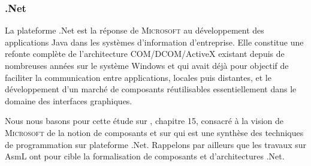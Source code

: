 \subsubsection{\textsf{.Net}}
\label{sec:.net}
La plateforme \textsf{.Net} est la r\'eponse de \textsc{Microsoft} au
d\'eveloppement des applications Java dans les syst\`emes
d'information d'entreprise. Elle constitue une refonte compl\`ete de
l'architecture \textsf{COM/DCOM/ActiveX}  existant depuis de nombreuses
ann\'ees sur le syst\`eme Windows et qui avait d\'ej\`a pour
objectif de faciliter la communication entre applications, locales
puis distantes, et le d\'eveloppement d'un march\'e de composants
r\'eutilisables essentiellement dans le domaine des interfaces
graphiques.

Nous nous basons pour cette \'etude sur \cite{szyperski}, chapitre
15, consacr\'e \`a la vision de \textsc{Microsoft} de la notion de
composants et sur \cite{lantin-dotnet} qui est une synth\`ese des
techniques de programmation sur plateforme  \textsf{.Net}. Rappelons
par ailleurs que les travaux sur
\textsf{AsmL}\cite{gurevich-asml-semantic,barnett-asm-components}  ont
pour cible la formalisation de composants et d'architectures \textsf{.Net}.

